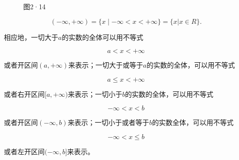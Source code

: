 \begin{figure}
\centering
\caption{图2·14}
\end{figure}

\[
(- \infty, + \infty) = \{x\mid -\infty<x<+\infty\} = \{x | x \in R \}.
\]

相应地，一切大于\(a\)的实数的全体可以用不等式

\[
a<x<+\infty
\]

或者开区间\((a, +\infty)\)来表示；一切大于或等于\(a\)的实数的全体，可以用不等式

\[
a \leqslant x < + \infty
\]

或者右开区间\([a, +\infty)\)来表示；一切小于\(b\)的实数的全体，可以用不等式

\[
- \infty < x < b
\]

或者开区间\((- \infty, b)\)来表示；一切小于或者等于\(b\)的实数全体，可以用不等式

\[
- \infty < x \leqslant b
\]

或者左开区间\((- \infty, b]\)来表示。

